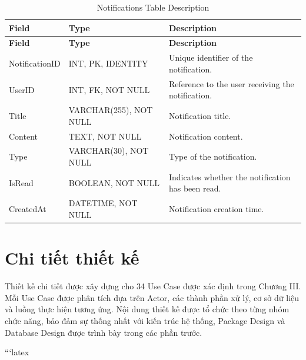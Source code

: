 \begin{longtable}{
		|>{\raggedright\arraybackslash}p{3.2cm}|
		>{\raggedright\arraybackslash}p{4.2cm}|
		>{\raggedright\arraybackslash}p{5.0cm}|
	}
	\caption{Notifications Table Description}
	\label{tab:notifications}\\
	\hline
	\textbf{Field} & \textbf{Type} & \textbf{Description} \\ \hline
	\endfirsthead
	\hline
	\textbf{Field} & \textbf{Type} & \textbf{Description} \\ \hline
	\endhead
	
	NotificationID & INT, PK, IDENTITY &
	Unique identifier of the notification. \\ \hline
	
	UserID & INT, FK, NOT NULL &
	Reference to the user receiving the notification. \\ \hline
	
	Title & VARCHAR(255), NOT NULL &
	Notification title. \\ \hline
	
	Content & TEXT, NOT NULL &
	Notification content. \\ \hline
	
	Type & VARCHAR(30), NOT NULL &
	Type of the notification. \\ \hline
	
	IsRead & BOOLEAN, NOT NULL &
	Indicates whether the notification has been read. \\ \hline
	
	CreatedAt & DATETIME, NOT NULL &
	Notification creation time. \\ \hline
	
\end{longtable}

\section{Chi tiết thiết kế}

Thiết kế chi tiết được xây dựng cho 34 Use Case được xác định trong
Chương III. Mỗi Use Case được phân tích dựa trên Actor, các thành phần
xử lý, cơ sở dữ liệu và luồng thực hiện tương ứng. Nội dung thiết kế
được tổ chức theo từng nhóm chức năng, bảo đảm sự thống nhất với kiến
trúc hệ thống, Package Design và Database Design được trình bày trong
các phần trước.

```latex

